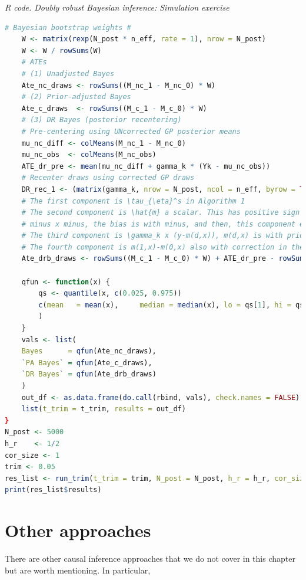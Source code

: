 \begin{tcolorbox}[enhanced,width=4.67in,center upper,
	fontupper=\large\bfseries,drop shadow southwest,sharp corners]
	\textit{R code. Doubly robust Bayesian inference: Simulation exercise}
	\begin{VF}
		\begin{lstlisting}[language=R]	
	# Bayesian bootstrap weights #
	W <- matrix(rexp(N_post * n_eff, rate = 1), nrow = N_post)
	W <- W / rowSums(W)
	# ATEs
	# (1) Unadjusted Bayes
	Ate_nc_draws <- rowSums((M_nc_1 - M_nc_0) * W)
	# (2) Prior-adjusted Bayes
	Ate_c_draws  <- rowSums((M_c_1 - M_c_0) * W)
	# (3) DR Bayes (posterior recentering)
	# Pre-centering using UNcorrected GP posterior means
	mu_nc_diff <- colMeans(M_nc_1 - M_nc_0)                
	mu_nc_obs  <- colMeans(M_nc_obs)                       
	ATE_dr_pre <- mean(mu_nc_diff + gamma_k * (Yk - mu_nc_obs))
	# Recenter draws using corrected GP draws
	DR_rec_1 <- (matrix(gamma_k, nrow = N_post, ncol = n_eff, byrow = TRUE)) * (matrix(Yk, nrow = N_post, ncol = n_eff, byrow = TRUE) - M_c_obs)
	# The first component is \tau_{\eta}^s in Algorithm 1
	# The second component is \hat{m} a scalar. This has positive sign because
	# minus x minus, the bias is with minus, and then, this component enters with minus in the bias term
	# The third component is \gamma_k x (y-m(d,x)), m(d,x) is with prior correction
	# The fourth component is m(1,x)-m(0,x) also with correction in the prior
	Ate_drb_draws <- rowSums((M_c_1 - M_c_0) * W) + ATE_dr_pre - rowSums(DR_rec_1) / n_eff - rowSums(M_c_1 - M_c_0) / n_eff
	
	qfun <- function(x) {
		qs <- quantile(x, c(0.025, 0.975))
		c(mean   = mean(x), 	median = median(x), lo = qs[1],	hi = qs[2],	len = diff(qs)
		)
	}	
	vals <- list(
	Bayes      = qfun(Ate_nc_draws),
	`PA Bayes` = qfun(Ate_c_draws),
	`DR Bayes` = qfun(Ate_drb_draws)
	)
	out_df <- as.data.frame(do.call(rbind, vals), check.names = FALSE)
	list(t_trim = t_trim, results = out_df)
}
N_post <- 5000
h_r    <- 1/2
cor_size <- 1
trim <- 0.05
res_list <- run_trim(t_trim = trim, N_post = N_post, h_r = h_r, cor_size = cor_size)
print(res_list$results)
\end{lstlisting}
	\end{VF}
\end{tcolorbox} 



\section{Other approaches}\label{sec12_12}
There are other causal inference approaches that we do not cover in this chapter but are worth mentioning. In particular, 

